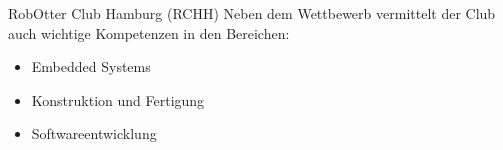 \begin{initiativkarte}{RobOtter Club Hamburg (RCHH)}
  Neben dem Wettbewerb vermittelt der Club auch wichtige Kompetenzen in den Bereichen:

  \begin{itemize}
    \item Embedded Systems
    \item Konstruktion und Fertigung
    \item Softwareentwicklung
  \end{itemize}

  \vspace{0.5cm}


  \vspace{0.6cm}
  \hawrule


\end{initiativkarte}